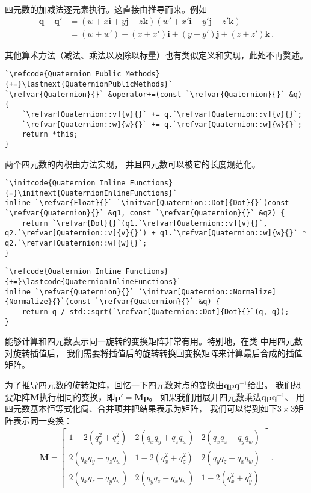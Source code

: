 四元数的加减法逐元素执行。这直接由推导而来。例如
\begin{align*}
    \bm q+\bm q' & =(w+x\mathbf{i}+y\mathbf{j}+z\mathbf{k})(w'+x'\mathbf{i}+y'\mathbf{j}+z'\mathbf{k})\nonumber \\
                 & =(w+w')+(x+x')\mathbf{i}+(y+y')\mathbf{j}+(z+z')\mathbf{k}\, .
\end{align*}

其他算术方法（减法、乘法以及除以标量）也有类似定义和实现，此处不再赘述。
\begin{lstlisting}
`\refcode{Quaternion Public Methods}{+=}\lastnext{QuaternionPublicMethods}`
`\refvar{Quaternion}{}` &operator+=(const `\refvar{Quaternion}{}` &q) {
    `\refvar[Quaternion::v]{v}{}` += q.`\refvar[Quaternion::v]{v}{}`;
    `\refvar[Quaternion::w]{w}{}` += q.`\refvar[Quaternion::w]{w}{}`;
    return *this;
}
\end{lstlisting}

两个四元数的内积由方法实现，
并且四元数可以被它的长度规范化。
\begin{lstlisting}
`\initcode{Quaternion Inline Functions}{=}\initnext{QuaternionInlineFunctions}`
inline `\refvar{Float}{}` `\initvar[Quaternion::Dot]{Dot}{}`(const `\refvar{Quaternion}{}` &q1, const `\refvar{Quaternion}{}` &q2) {
    return `\refvar{Dot}{}`(q1.`\refvar[Quaternion::v]{v}{}`, q2.`\refvar[Quaternion::v]{v}{}`) + q1.`\refvar[Quaternion::w]{w}{}` * q2.`\refvar[Quaternion::w]{w}{}`;
}
\end{lstlisting}

\begin{lstlisting}
`\refcode{Quaternion Inline Functions}{+=}\lastcode{QuaternionInlineFunctions}`
inline `\refvar{Quaternion}{}` `\initvar[Quaternion::Normalize]{Normalize}{}`(const `\refvar{Quaternion}{}` &q) {
    return q / std::sqrt(`\refvar[Quaternion::Dot]{Dot}{}`(q, q));
}
\end{lstlisting}

能够计算和四元数表示同一旋转的变换矩阵非常有用。特别地，在类
中用四元数对旋转插值后，
我们需要将插值后的旋转转换回变换矩阵来计算最后合成的插值矩阵。

为了推导四元数的旋转矩阵，回忆一下四元数对点的变换由$\bm q\bm p\bm q^{-1}$给出。
我们想要矩阵$\bm M$执行相同的变换，即$\bm p'=\bm M\bm p$。
如果我们用展开四元数乘法$\bm q\bm p\bm q^{-1}$、
用四元数基本恒等式化简、合并项并把结果表示为矩阵，
我们可以得到如下$3\times3$矩阵表示同一变换：
\begin{align}\label{eq:2.6}
    \bm M=\left[
        \begin{array}{ccc}
            1-2(q_y^2+q_z^2) & 2(q_xq_y+q_zq_w) & 2(q_xq_z-q_yq_w) \\
            2(q_xq_y-q_zq_w) & 1-2(q_x^2+q_z^2) & 2(q_yq_z+q_xq_w) \\
            2(q_xq_z+q_yq_w) & 2(q_yq_z-q_xq_w) & 1-2(q_x^2+q_y^2)
        \end{array}
        \right]\, .
\end{align}

